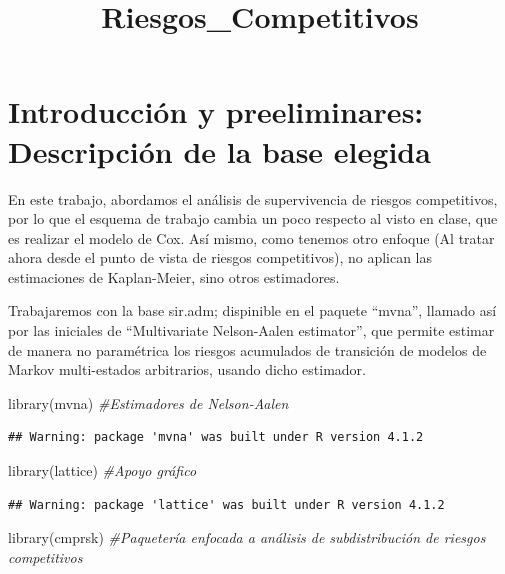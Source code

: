 \documentclass[
]{article}
\title{Riesgos\_Competitivos}
\author{}
\date{\vspace{-2.5em}}
\newenvironment{Shaded}{\begin{snugshade}}{\end{snugshade}}
\newcommand{\CommentTok}[1]{\textcolor[rgb]{0.56,0.35,0.01}{\textit{#1}}}
\newcommand{\FunctionTok}[1]{\textcolor[rgb]{0.00,0.00,0.00}{#1}}
\newcommand{\NormalTok}[1]{#1}
\begin{document}
\maketitle

\hypertarget{introducciuxf3n-y-preeliminares-descripciuxf3n-de-la-base-elegida}{%
\section{Introducción y preeliminares: Descripción de la base
elegida}\label{introducciuxf3n-y-preeliminares-descripciuxf3n-de-la-base-elegida}}

En este trabajo, abordamos el análisis de supervivencia de riesgos
competitivos, por lo que el esquema de trabajo cambia un poco respecto
al visto en clase, que es realizar el modelo de Cox. Así mismo, como
tenemos otro enfoque (Al tratar ahora desde el punto de vista de riesgos
competitivos), no aplican las estimaciones de Kaplan-Meier, sino otros
estimadores.

Trabajaremos con la base sir.adm; dispinible en el paquete ``mvna'',
llamado así por las iniciales de ``Multivariate Nelson-Aalen
estimator'', que permite estimar de manera no paramétrica los riesgos
acumulados de transición de modelos de Markov multi-estados arbitrarios,
usando dicho estimador.

\begin{Shaded}
\begin{Highlighting}[]
\FunctionTok{library}\NormalTok{(mvna) }\CommentTok{\#Estimadores de Nelson{-}Aalen}
\end{Highlighting}
\end{Shaded}

\begin{verbatim}
## Warning: package 'mvna' was built under R version 4.1.2
\end{verbatim}

\begin{Shaded}
\begin{Highlighting}[]
\FunctionTok{library}\NormalTok{(lattice) }\CommentTok{\#Apoyo gráfico}
\end{Highlighting}
\end{Shaded}

\begin{verbatim}
## Warning: package 'lattice' was built under R version 4.1.2
\end{verbatim}

\begin{Shaded}
\begin{Highlighting}[]
\FunctionTok{library}\NormalTok{(cmprsk) }\CommentTok{\#Paquetería enfocada a análisis de subdistribución de riesgos competitivos}
\end{Highlighting}
\end{Shaded}
\end{document}
